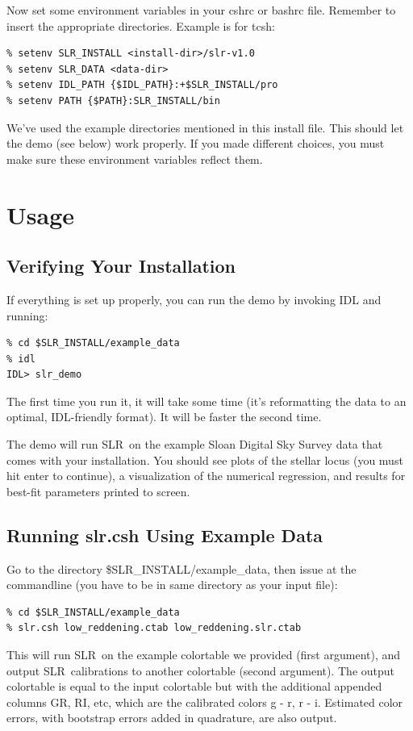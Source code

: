 \documentclass{report}
\newcommand{\slr}{SLR}
\begin{document}
Now set some environment variables in your cshrc or bashrc file. Remember to insert the appropriate directories. Example is for tcsh:
\begin{verbatim}
% setenv SLR_INSTALL <install-dir>/slr-v1.0
% setenv SLR_DATA <data-dir>
% setenv IDL_PATH {$IDL_PATH}:+$SLR_INSTALL/pro
% setenv PATH {$PATH}:SLR_INSTALL/bin
\end{verbatim}

We've used the example directories mentioned in this install
file. This should let the demo (see below) work properly. If you made
different choices, you must make sure these environment variables
reflect them.

\chapter{Usage}
\label{sec:verify}

\section{Verifying Your Installation}

If everything is set up properly, you can run the demo by invoking IDL
and running:
\begin{verbatim}
% cd $SLR_INSTALL/example_data
% idl
IDL> slr_demo
\end{verbatim}

The first time you run it, it will take some time (it's reformatting
the data to an optimal, IDL-friendly format). It will be faster the
second time.

The demo will run \slr\ on the example Sloan Digital Sky Survey data
that comes with your installation. You should see plots of the stellar
locus (you must hit enter to continue), a visualization of the
numerical regression, and results for best-fit parameters printed to
screen.


\section{Running slr.csh Using Example Data}

Go to the directory \$SLR\_INSTALL/example\_data, then issue at
the commandline (you have to be in same directory as your input file):
\begin{verbatim}
% cd $SLR_INSTALL/example_data
% slr.csh low_reddening.ctab low_reddening.slr.ctab
\end{verbatim}

This will run \slr\ on the example colortable we provided (first
argument), and output \slr\ calibrations to another colortable (second
argument). The output colortable is equal to the input colortable but
with the additional appended columns GR, RI, etc, which are the
calibrated colors g - r, r - i. Estimated color errors, with bootstrap
errors added in quadrature, are also output.
\end{document}
